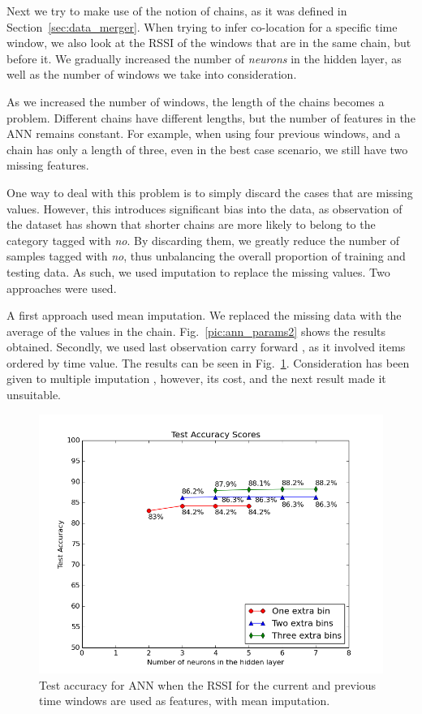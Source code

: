 Next we try to make use of the notion of chains, as it was defined in Section~\ref{sec:data_merger}. When trying to infer co-location for a specific time window, we also look at the RSSI of the windows that are in the same chain, but before it. We gradually increased the number of \textit{neurons} in the hidden layer, as well as the number of windows we take into consideration. 

As we increased the number of windows, the length of the chains becomes a problem. Different chains have different lengths, but the number of features in the ANN remains constant. For example, when using four previous windows, and a chain has only a length of three, even in the best case scenario, we still have two missing features. 

One way to deal with this problem is to simply discard the cases that are missing values. However, this introduces significant bias into the data, as observation of the dataset has shown that shorter chains are more likely to belong to the category tagged with \textit{no}. By discarding them, we greatly reduce the number of samples tagged with \textit{no}, thus unbalancing the overall proportion of training and testing data. As such, we used imputation to replace the missing values. Two approaches were used.

A first approach used mean imputation. We replaced the missing data with the average of the values in the chain. Fig.~\ref{pic:ann_params2} shows the results obtained. Secondly, we used last observation carry forward \cite{locf}, as it involved items ordered by time value. The results can be seen in Fig.~\ref{pic:ann_params1}. Consideration has been given to multiple imputation \cite{rubin2009multiple}, however, its cost, and the next result made it unsuitable.  

\begin{figure}[h]
	\begin{center}
		\includegraphics[scale=0.6]{figures/ann_params2.png}
	\end{center}
	
	\caption{Test accuracy for ANN when the RSSI for the current and previous time windows are used as features, with mean imputation.}
	\label{pic:ann_params1}

\end{figure}


